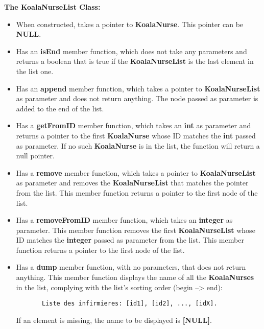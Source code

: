 \textbf{The KoalaNurseList Class:}
\begin{itemize}

  \item When constructed, takes a pointer to \textbf{KoalaNurse}. This pointer
    can be \textbf{NULL}.

  \item Has an \textbf{isEnd} member function, which does not take any parameters and
    returns a boolean that is true if the \textbf{KoalaNurseList} is the last element
    in the list one.

  \item Has an \textbf{append} member function, which takes a pointer to
    \textbf{KoalaNurseList} as parameter and does not return anything. The node
    passed as parameter is added to the end of the list.

  \item Has a \textbf{getFromID} member function, which takes an \textbf{int} as
    parameter and returns a pointer to the first \textbf{KoalaNurse} whose ID matches
    the \textbf{int} passed as parameter. If no such \textbf{KoalaNurse} is in the
    list, the function will return a null pointer.


  \item Has a \textbf{remove} member function, which takes a pointer to
    \textbf{KoalaNurseList} as parameter and removes the \textbf{KoalaNurseList}
    that matches the pointer from the list. This member function returns a pointer
    to the first node of the list.

  \item Has a \textbf{removeFromID} member function, which takes an \textbf{integer}
    as parameter. This member function removes the first \textbf{KoalaNurseList} whose
    ID matches the \textbf{integer} passed as parameter from the list. This member
    function returns a pointer to the first node of the list.

  \item Has a \textbf{dump} member function, with no parameters, that does not return
    anything. This member function displays the name of all the \textbf{KoalaNurses}
    in the list, complying with the list's sorting order (begin --> end):
    \begin{lstlisting}
       Liste des infirmieres: [id1], [id2], ..., [idX].
    \end{lstlisting}
    If an element is missing, the name to be displayed is \textbf{[NULL]}.
\end{itemize}
~\\


